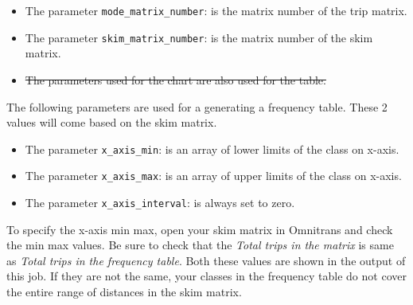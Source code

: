 \documentclass[
  letterpaper,
  DIV=11,
  numbers=noendperiod]{scrreprt}
\providecommand{\tightlist}{%
  \setlength{\itemsep}{0pt}\setlength{\parskip}{0pt}}
\begin{document}
\begin{itemize}
\tightlist
\item
  The parameter \texttt{mode\_matrix\_number}: is the matrix number of
  the trip matrix.
\item
  The parameter \texttt{skim\_matrix\_number}: is the matrix number of
  the skim matrix.
\item
  \st{The parameters used for the chart are also used for the table.}
\end{itemize}

The following parameters are used for a generating a frequency table.
These 2 values will come based on the skim matrix.

\begin{itemize}
\tightlist
\item
  The parameter \texttt{x\_axis\_min}: is an array of lower limits of
  the class on x-axis.
\item
  The parameter \texttt{x\_axis\_max}: is an array of upper limits of
  the class on x-axis.
\item
  The parameter \texttt{x\_axis\_interval}: is always set to zero.
\end{itemize}

\begin{tcolorbox}[enhanced jigsaw, arc=.35mm, toptitle=1mm, colbacktitle=quarto-callout-important-color!10!white, toprule=.15mm, opacitybacktitle=0.6, coltitle=black, opacityback=0, colback=white, colframe=quarto-callout-important-color-frame, rightrule=.15mm, bottomtitle=1mm, breakable, bottomrule=.15mm, title=\textcolor{quarto-callout-important-color}{\faExclamation}\hspace{0.5em}{Important}, titlerule=0mm, leftrule=.75mm, left=2mm]

To specify the x-axis min max, open your skim matrix in Omnitrans and
check the min max values. Be sure to check that the \emph{Total trips in
the matrix} is same as \emph{Total trips in the frequency table}. Both
these values are shown in the output of this job. If they are not the
same, your classes in the frequency table do not cover the entire range
of distances in the skim matrix.

\end{tcolorbox}
\end{document}

